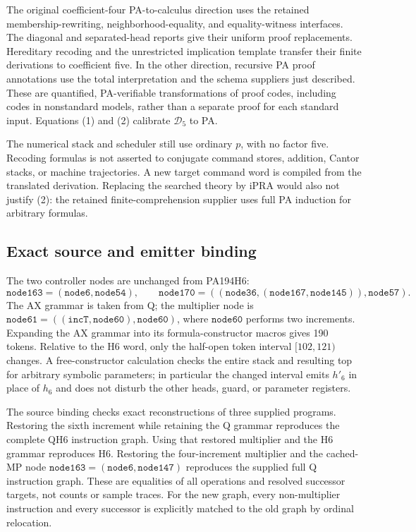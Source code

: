 The original coefficient-four PA-to-calculus direction uses the retained
membership-rewriting, neighborhood-equality, and equality-witness
interfaces. The diagonal and separated-head reports give their uniform
proof replacements. Hereditary recoding and the unrestricted implication
template transfer their finite derivations to coefficient five. In the
other direction, recursive PA proof annotations use the total
interpretation and the schema suppliers just described. These are
quantified, PA-verifiable transformations of proof codes, including
codes in nonstandard models, rather than a separate proof for each
standard input. Equations (1) and (2) calibrate $\mathcal D_5$ to PA.

The numerical stack and scheduler still use ordinary $p$, with no factor
five. Recoding formulas is not asserted to conjugate command stores,
addition, Cantor stacks, or machine trajectories. A new target command
word is compiled from the translated derivation. Replacing the searched
theory by iPRA would also not justify (2): the retained finite-comprehension
supplier uses full PA induction for arbitrary formulas.

\subsection{Exact source and emitter binding}

The two controller nodes are unchanged from PA194H6:
\[
 \mathtt{node163}=(\mathtt{node6},\mathtt{node54}),\qquad
 \mathtt{node170}=((\mathtt{node36},
       (\mathtt{node167},\mathtt{node145})),\mathtt{node57}).
\]
The AX grammar is taken from Q; the multiplier node is
$\mathtt{node61}=((\mathtt{incT},\mathtt{node60}),\mathtt{node60})$,
where $\mathtt{node60}$ performs two increments. Expanding the AX
grammar into its formula-constructor macros gives 190 tokens. Relative to the H6 word, only the half-open token interval
$[102,121)$ changes. A free-constructor calculation checks the entire
stack and resulting top for arbitrary symbolic parameters; in particular
the changed interval emits $h'_6$ in place of $h_6$ and does not disturb
the other heads, guard, or parameter registers.

The source binding checks exact reconstructions of three supplied programs.
Restoring the sixth increment while retaining the Q grammar reproduces the
complete QH6 instruction graph. Using that restored multiplier and the H6
grammar reproduces H6. Restoring the four-increment multiplier and the
cached-MP node $\mathtt{node163}=(\mathtt{node6},\mathtt{node147})$
reproduces the supplied full Q instruction graph. These are equalities
of all operations and resolved successor targets, not counts or sample
traces. For the new graph, every non-multiplier instruction and every
successor is explicitly matched to the old graph by ordinal relocation.

